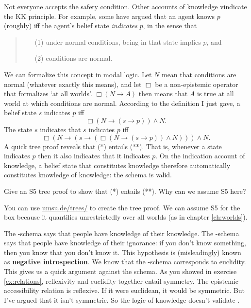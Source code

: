 Not everyone accepts the safety condition. Other accounts of knowledge vindicate
the KK principle. For example, some have argued that an agent knows $p$
(roughly) iff the agent's belief state \emph{indicates} $p$, in the sense that
%
\begin{quote}
\begin{enumerate}
\item[(1)] under normal conditions, being in that state implies $p$, and
\item[(2)] conditions are normal.
\end{enumerate}
\end{quote}
% 
We can formalize this concept in modal logic. Let $N$ mean that conditions are
normal (whatever exactly this means), and let $\Box$ be a non-epistemic operator
that formalizes `at all worlds'. $\Box(N \to A)$ then means that $A$ is true at
all world at which conditions are normal. According to the definition I just
gave, a belief state $s$ indicates $p$ iff
\begin{equation}\tag{*}
  \Box(N \to (s\to p)) \land N.
\end{equation}
The state $s$ indicates that $s$ indicates $p$ iff
\begin{equation}\tag{**}
  \Box(N \to (s \to (\Box(N \to (s \to p)) \land N))) \land N.
\end{equation}
A quick tree proof reveals that (*) entails (**). That is, whenever a state
indicates $p$ then it also indicates that it indicates $p$. On the indication
account of knowledge, a belief state that constitutes knowledge therefore
automatically constitutes knowledge of knowledge: the  schema is valid.

\begin{exercise}
  Give an S5 tree proof to show that (*) entails (**). Why can we
  assume S5 here?
\end{exercise}
\begin{solution}
  You can use
  \href{https://www.umsu.de/trees/}{umsu.de/trees/} to
  create the tree proof. We can assume S5 for the box because it quantifies
  unrestrictedly over all worlds (as in chapter \ref{ch:worlds}).
\end{solution}

The -schema says that people have knowledge of their knowledge. The
-schema says that people have knowledge of their ignorance: if you don't
know something, then you know that you don't know it. This hypothesis is
(misleadingly) known as \textbf{negative introspection}.
%
%
We know that the -schema corresponds to euclidity. This gives us a quick
argument against the schema. As you showed in exercise \ref{ex:relations},
reflexivity and euclidity together entail symmetry. The epistemic accessibility
relation is reflexive. If it were euclidean, it would be symmetric. But I've
argued that it isn't symmetric. So the logic of knowledge doesn't validate
.

